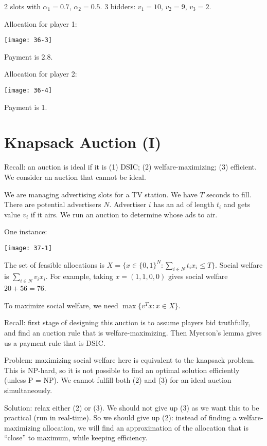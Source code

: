 \documentclass[12pt,letterpaper]{report}
\begin{document}
\begin{ex}
  2 slots with $\alpha_1 = 0.7$, $\alpha_2 = 0.5$.
  3 bidders: $v_1 = 10$, $v_2 = 9$, $v_3 = 2$.

  Allocation for player 1:
  \begin{center}
    \texttt{[image: 36-3]}
  \end{center}
  Payment is $2.8$.

  Allocation for player 2:
  \begin{center}
    \texttt{[image: 36-4]}
  \end{center}
  Payment is 1.
\end{ex}

\section{Knapsack Auction (I)}

Recall: an auction is ideal if it is (1) DSIC; (2) welfare-maximizing; (3) efficient.
We consider an auction that cannot be ideal.

\begin{ex}
  We are managing advertising slots for a TV station.
  We have $T$ seconds to fill.
  There are potential advertisers $N$.
  Advertiser $i$ has an ad of length $t_i$ and gets value $v_i$ if it airs.
  We run an auction to determine whose ads to air.

  One instance:
  \begin{center}
    \texttt{[image: 37-1]}
  \end{center}
  The set of feasible allocations is $X = \{ x \in \{0, 1\}^N : \sum_{i \in N} t_i x_i \leq T \}$.
  Social welfare is $\sum_{i \in N} v_i x_i$.
  For example, taking $x = (1, 1, 0, 0)$ gives social welfare $20 + 56 = 76$.

  To maximize social welfare, we need $\max \{ v^T x : x \in X \}$.

  Recall: first stage of designing this auction is to assume players bid truthfully, and find an
  auction rule that is welfare-maximizing.
  Then Myerson's lemma gives us a payment rule that is DSIC.

  Problem: maximizing social welfare here is equivalent to the knapsack problem.
  This is NP-hard, so it is not possible to find an optimal solution efficiently (unless P = NP).
  We cannot fulfill both (2) and (3) for an ideal auction simultaneously.

  Solution: relax either (2) or (3).
  We should not give up (3) as we want this to be practical (run in real-time).
  So we should give up (2): instead of finding a welfare-maximizing allocation, we will find an
  approximation of the allocation that is ``close'' to maximum, while keeping efficiency.
\end{ex}
\end{document}
